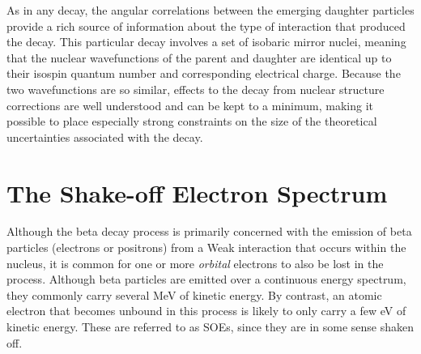 As in any decay, the angular correlations between the emerging daughter particles provide a rich source of information about the type of interaction that produced the decay.  
This particular decay involves a set of isobaric mirror nuclei, meaning that the nuclear wavefunctions of the parent and daughter are identical up to their isospin quantum number and corresponding electrical charge.  Because the two wavefunctions are so similar, effects to the decay from nuclear structure corrections are well understood and can be kept to a minimum, making it possible to place especially strong constraints on the size of the theoretical uncertainties associated with the decay.







\section{The Shake-off Electron Spectrum}
\label{section:soe_intro}
Although the beta decay process is primarily concerned with the emission of beta particles (electrons or positrons) from a Weak interaction that occurs within the nucleus, it is common for one or more \emph{orbital} electrons to also be lost in the process.  Although beta particles are emitted over a continuous energy spectrum, they commonly carry several MeV of kinetic energy.  By contrast, an atomic electron that becomes unbound in this process is likely to only carry a few eV of kinetic energy.  These are referred to as \acp{SOE}, since they are in some sense shaken off.

